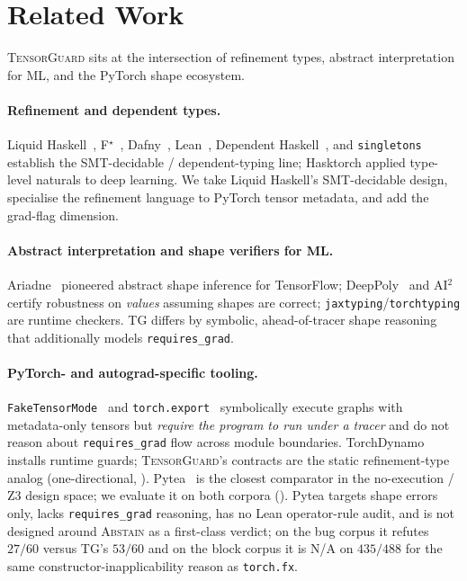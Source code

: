\section{Related Work}\label{sec:related}

\textsc{TensorGuard} sits at the intersection of refinement
types, abstract interpretation for ML, and the PyTorch shape
ecosystem.

\paragraph{Refinement and dependent types.} Liquid
Haskell~\citep{vazou2014liquidhaskell}, F$^\star$~\citep{swamy2016dependent},
Dafny~\citep{leino2010dafny}, Lean~\citep{moura2021lean4},
Dependent Haskell~\citep{eisenberg2016dependent}, and
\texttt{singletons}~\citep{eisenberg2012singletons} establish
the SMT-decidable / dependent-typing line; Hasktorch applied
type-level naturals to deep learning. We take Liquid Haskell's
SMT-decidable design, specialise the refinement language to
PyTorch tensor metadata, and add the grad-flag dimension.

\paragraph{Abstract interpretation and shape verifiers for ML.}
Ariadne~\citep{dolby2018ariadne} pioneered abstract shape
inference for TensorFlow; DeepPoly~\citep{singh2019deeppoly}
and AI$^2$~\citep{gehr2018ai2} certify robustness on
\emph{values} assuming shapes are correct;
\texttt{jaxtyping}/\texttt{torchtyping} are runtime checkers.
\textsc{TG} differs by symbolic, ahead-of-tracer shape reasoning
that additionally models \texttt{requires\_grad}.

\paragraph{PyTorch- and autograd-specific tooling.}
\texttt{FakeTensorMode}~\citep{faketensor} and
\texttt{torch.export}~\citep{torchexport} symbolically execute
graphs with metadata-only tensors but \emph{require the program
to run under a tracer} and do not reason about
\texttt{requires\_grad} flow across module boundaries.
TorchDynamo~\citep{ansel2024pytorch2} installs runtime guards;
\textsc{TensorGuard}'s contracts are the static refinement-type
analog (one-directional, ). Pytea~\citep{lee2020pytea}
is the closest comparator in the no-execution / Z3 design
space; we evaluate it on both corpora
(). Pytea targets shape errors only,
lacks \texttt{requires\_grad} reasoning, has no Lean
operator-rule audit, and is not designed around \textsc{Abstain}
as a first-class verdict; on the bug corpus it refutes $27/60$
versus \textsc{TG}'s $53/60$ and on the block corpus it is
\textsc{N/A} on $435/488$ for the same constructor-inapplicability
reason as \texttt{torch.fx}.

